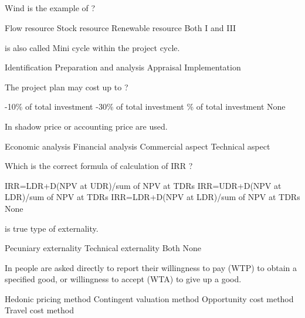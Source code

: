 
\subsection*{}

\begin{questions}

\question Wind is the example of \fillin[][3cm] ?
\begin{choices}
\choice Flow resource
\choice Stock resource
\choice Renewable resource
\choice Both I and III
\end{choices}

\question \fillin[][3cm] is also called Mini cycle within the project cycle.
\begin{choices}
\choice Identification
\choice Preparation and analysis
\choice Appraisal
\choice Implementation
\end{choices}

\question The project plan may cost up to \fillin[][3cm]?
\begin{choices}
-10\% of total investment
-30\% of total investment
\% of total investment
\choice None
\end{choices}

\question In \fillin[][3cm] shadow price or accounting price are used.
\begin{choices}
\choice Economic analysis
\choice Financial analysis
\choice Commercial aspect
\choice Technical aspect
\end{choices}

\question Which is the correct formula of calculation of IRR ?
\begin{choices}
\choice IRR=LDR+D(NPV at UDR)/sum of NPV at TDRs
\choice IRR=UDR+D(NPV at LDR)/sum of NPV at TDRs
\choice IRR=LDR+D(NPV at LDR)/sum of NPV at TDRs
\choice None
\end{choices}

\question \fillin[][3cm] is true type of externality.
\begin{choices}
\choice Pecuniary externality
\choice Technical externality
\choice Both
\choice None
\end{choices}

\question In \fillin[][3cm] people are asked directly to report their willingness to pay (WTP) to obtain a specified good, or willingness to accept (WTA) to give up a good.
\begin{choices}
\choice Hedonic pricing method
\choice Contingent valuation method
\choice Opportunity cost method
\choice Travel cost method
\end{choices}


\end{questions}
